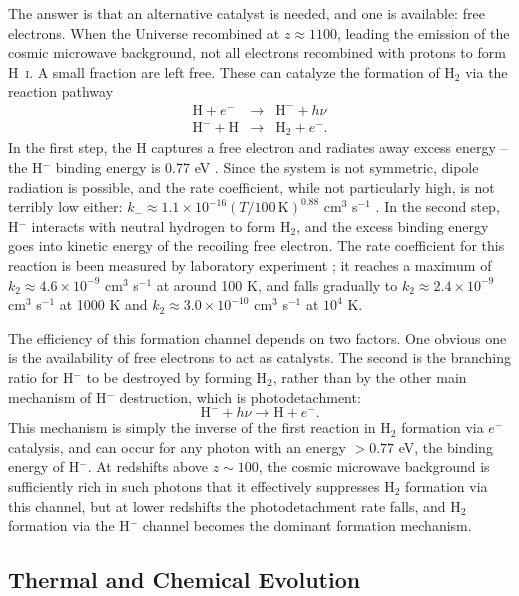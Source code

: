 The answer is that an alternative catalyst is needed, and one is available: free electrons. When the Universe recombined at $z\approx 1100$, leading the emission of the cosmic microwave background, not all electrons recombined with protons to form H~\textsc{i}. A small fraction are left free. These can catalyze the formation of H$_2$ via the reaction pathway
\begin{eqnarray}
\mathrm{H} + e^- & \rightarrow & \mathrm{H}^- + h\nu \\
\mathrm{H}^- + \mathrm{H} & \rightarrow & \mathrm{H}_2 + e^-.
\end{eqnarray}
In the first step, the H captures a free electron and radiates away excess energy -- the H$^-$ binding energy is 0.77 eV \citep{weisner64a}. Since the system is not symmetric, dipole radiation is possible, and the rate coefficient, while not particularly high, is not terribly low either: $k_{-} \approx 1.1\times 10^{-16}(T/100\,\mathrm{K})^{0.88}$ cm$^3$ s$^{-1}$ \citep{glover08a}. In the second step, H$^{-}$ interacts with neutral hydrogen to form H$_2$, and the excess binding energy goes into kinetic energy of the recoiling free electron. The rate coefficient for this reaction is been measured by laboratory experiment \citep{kreckel10a}; it reaches a maximum of $k_2 \approx 4.6\times 10^{-9}$ cm$^3$ s$^{-1}$ at around 100 K, and falls gradually to $k_2\approx 2.4\times 10^{-9}$ cm$^3$ s$^{-1}$ at 1000 K and $k_2\approx 3.0\times 10^{-10}$ cm$^3$ s$^{-1}$ at $10^4$ K.

The efficiency of this formation channel depends on two factors. One obvious one is the availability of free electrons to act as catalysts. The second is the branching ratio for H$^-$ to be destroyed by forming H$_2$, rather than by the other main mechanism of H$^-$ destruction, which is photodetachment:
\begin{equation}
\mathrm{H}^- + h\nu \rightarrow \mathrm{H} + e^{-}.
\end{equation}
This mechanism is simply the inverse of the first reaction in H$_2$ formation via $e^-$ catalysis, and can occur for any photon with an energy $>0.77$ eV, the binding energy of H$^-$. At redshifts above $z\sim 100$, the cosmic microwave background is sufficiently rich in such photons that it effectively suppresses H$_2$ formation via this channel, but at lower redshifts the photodetachment rate falls, and H$_2$ formation via the H$^-$ channel becomes the dominant formation mechanism.

\subsection{Thermal and Chemical Evolution}

